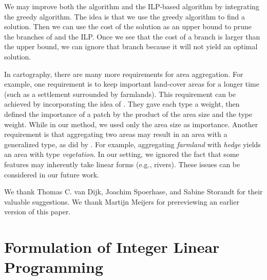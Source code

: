 \documentclass[acmsmall,natbib=false]{acmart}
\begin{document}
We may improve both the \Astar algorithm and the ILP-based 
algorithm by integrating the greedy algorithm.
The idea is that we use the greedy algorithm to find 
a solution. 
Then we can use the cost of the solution as an upper bound to 
prune the branches of \Astar and the ILP. 
Once we see that
the cost of a branch is larger than the upper bound,
we can ignore that branch  
because it will not yield an optimal solution.



In cartography, there are many more requirements 
for area aggregation.
For example, one requirement is 
to keep important land-cover areas for a longer time
(such as a settlement surrounded by farmlands).
This requirement can be achieved by incorporating the idea of
\textcite{Dilo2009tGAP}.
They gave each type a weight, 
then defined the importance of a patch 
by the product of the area size and the type weight.
While in our method, we used only the area size as importance.
%
Another requirement is that 
aggregating two areas may result in 
an area with a generalized type,
as did by \textcite{vanSmaalen2003}. 
For example, aggregating 
\emph{farmland} with \emph{hedge} 
yields an area with type \emph{vegetation}.
%
In our setting, we ignored the fact that
some features may inherently take linear forms
(e.g., rivers).
%
These issues can be considered in our future work.
%





\begin{acks}
We thank Thomas C. van Dijk, Joachim Spoerhase, 
and Sabine Storandt for their valuable suggestions.
We thank Martijn Meijers for 
prereviewing an earlier version of this paper.
\end{acks}


\printbibliography

\clearpage

\appendix
\section{Formulation of Integer Linear Programming}
\label{app:AreaAgg_ILP}
\end{document}
